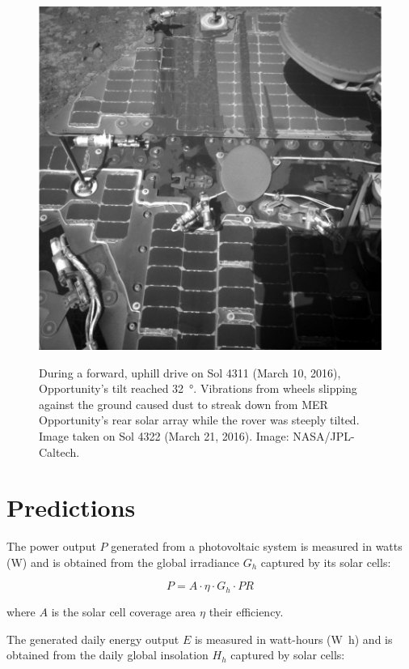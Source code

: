\begin{figure}[h]
  \centering
  \hypersetup{linkcolor=captionTextColor}
  \includegraphics[width=0.6\linewidth]{sections/power-and-energy-predictions/images/mer-opportunity-dust-streaks.png}\\
  \caption[Streak of dust on \ac{MER} Opportunity's rear solar array during a steep tilt]
          {During a forward, uphill drive on Sol 4311 (March 10, 2016), Opportunity's tilt reached \SI{32}{\degree}. Vibrations from wheels slipping against the ground caused dust to streak down from \ac{MER} Opportunity's rear solar array while the rover was steeply tilted. Image taken on Sol 4322 (March 21, 2016). Image: \ac{NASA}/\ac{JPL}-Caltech.}
  \label{fig:image:mer-opportunity-dust-streaks}
\end{figure}

\clearpage
\section{Predictions}
\label{sec:PowerAndEnergyPredictions:Predictions}

The power output $P$ generated from a photovoltaic system is measured in watts (\si{\watt}) and is obtained from the global irradiance $G_{h}$ captured by its solar cells:

\begin{equation}
  \label{eq:SA_power}
  P = A \cdot \eta \cdot G_{h} \cdot PR
\end{equation}

where $A$ is the solar cell coverage area $\eta$ their efficiency.

The generated daily energy output $E$ is measured in watt-hours (\si{\watt\hour}) and is obtained from the daily global insolation $H_{h}$ captured by solar cells:

